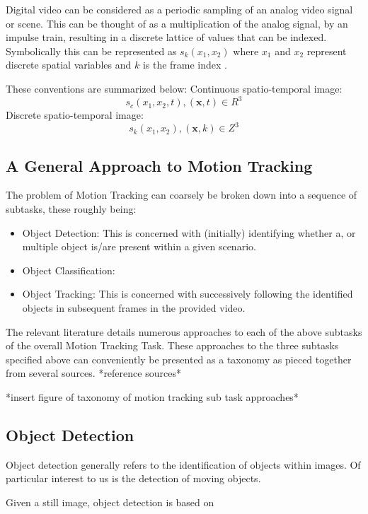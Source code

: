Digital video can be considered as a periodic sampling of an analog video signal
or scene. This can be thought of as a multiplication of the analog signal, by an
impulse train, resulting in a discrete lattice of values that can be indexed.
Symbolically this can be represented as $s_k(x_1,x_2)$ where $x_1$ and
$x_2$ represent discrete spatial variables and $k$ is the frame index
\cite{Tekalp2014}. 

These conventions are summarized below: \newline
Continuous spatio-temporal image:
$$s_c(x_1,x_2,t), (\textbf{x},t) \in R^3$$ \newline 
Discrete spatio-temporal image:
$$s_k(x_1,x_2), (\textbf{x},k) \in Z^3$$ 
    
\subsection{A General Approach to Motion Tracking}\label{literature_review_general_approach}
The problem of Motion Tracking can coarsely be broken down into a sequence of
subtasks, these roughly being:
    \begin{itemize}
        \item Object Detection: This is concerned with (initially) identifying
            whether a, or multiple object is/are present within a given scenario.
        \item Object Classification: 
        \item Object Tracking: This is concerned with successively following the
            identified objects in subsequent frames in the provided video.
    \end{itemize}
The relevant literature details numerous approaches to each of the above
subtasks of the overall Motion Tracking Task. 
These approaches to the three subtasks specified above can conveniently be
presented as a taxonomy as pieced together from several sources. *reference
sources* 

*insert figure of taxonomy of motion tracking sub task approaches*
 
\subsection{Object Detection}
Object detection generally refers to the identification of objects within
images. Of particular interest to us is the detection of moving objects.

Given a still image, object detection is based on 


